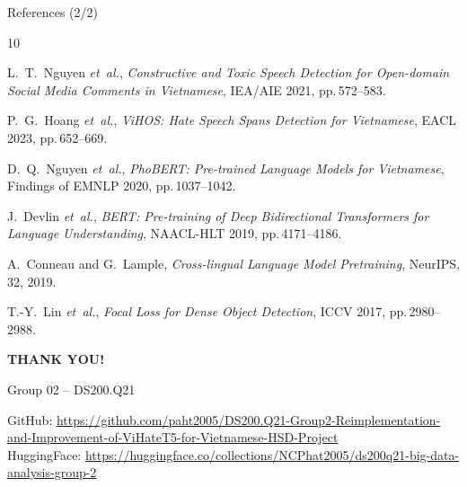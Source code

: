 \documentclass[11pt, aspectratio=169]{beamer}
\begin{document}
\begin{frame}[shrink=5]{References (2/2)}
\scriptsize
\begin{thebibliography}{10}

L.~T.~Nguyen \emph{et~al.},
\textit{Constructive and Toxic Speech Detection for Open-domain Social Media Comments in Vietnamese},
IEA/AIE 2021, pp.\,572--583.

P.~G.~Hoang \emph{et~al.},
\textit{ViHOS: Hate Speech Spans Detection for Vietnamese},
EACL 2023, pp.\,652--669.

D.~Q.~Nguyen \emph{et~al.},
\textit{PhoBERT: Pre-trained Language Models for Vietnamese},
Findings of EMNLP 2020, pp.\,1037--1042.

J.~Devlin \emph{et~al.},
\textit{BERT: Pre-training of Deep Bidirectional Transformers for Language Understanding},
NAACL-HLT 2019, pp.\,4171--4186.

A.~Conneau and G.~Lample,
\textit{Cross-lingual Language Model Pretraining},
NeurIPS, 32, 2019.

T.-Y.~Lin \emph{et~al.},
\textit{Focal Loss for Dense Object Detection},
ICCV 2017, pp.\,2980--2988.

\end{thebibliography}
\end{frame}

\begin{frame}[plain]
  \begin{center}
    \Huge\textbf{THANK YOU!}

    \vspace{1cm}
    \large Group 02 -- DS200.Q21

    \vspace{0.5cm}
    \normalsize
    GitHub: \url{https://github.com/paht2005/DS200.Q21-Group2-Reimplementation-and-Improvement-of-ViHateT5-for-Vietnamese-HSD-Project}\\
    HuggingFace: \url{https://huggingface.co/collections/NCPhat2005/ds200q21-big-data-analysis-group-2}
  \end{center}
\end{frame}
\end{document}
